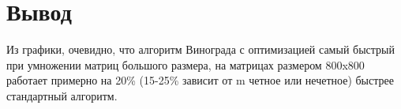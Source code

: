 
\section{Вывод}

Из графики, очевидно, что алгоритм Винограда с оптимизацией самый быстрый
при умножении матриц большого размера,
на матрицах размером 800x800 работает примерно на 20\% (15-25\% зависит от m четное или нечетное)
быстрее стандартный алгоритм.
